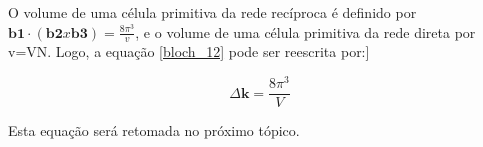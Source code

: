 	\par O volume de uma célula primitiva da rede recíproca é definido por $\mathbf{b1} \cdot \left(\mathbf{b2} x \mathbf{b3}\right) = \frac{8\pi^3}{v}$, e o volume de uma célula primitiva da rede direta por v=VN. Logo, a equação \eqref{bloch_12} pode ser reescrita por:]

	\begin{equation}
		\label{bloch_13}
		\Delta \mathbf{k} = \frac{8\pi^3}{V}
	\end{equation}

	\par Esta equação será retomada no próximo tópico.
